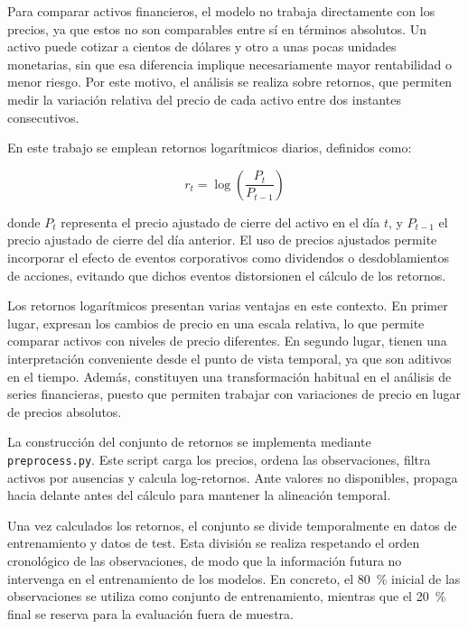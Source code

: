Para comparar activos financieros, el modelo no trabaja directamente con los precios, ya que estos no son comparables entre sí en términos absolutos. Un activo puede cotizar a cientos de dólares y otro a unas pocas unidades monetarias, sin que esa diferencia implique necesariamente mayor rentabilidad o menor riesgo. Por este motivo, el análisis se realiza sobre retornos, que permiten medir la variación relativa del precio de cada activo entre dos instantes consecutivos.

En este trabajo se emplean retornos logarítmicos diarios, definidos como:

\begin{equation}
r_t = \log\left(\frac{P_t}{P_{t-1}}\right)
\label{eq:retorno_logaritmico}
\end{equation}

donde \(P_t\) representa el precio ajustado de cierre del activo en el día \(t\), y \(P_{t-1}\) el precio ajustado de cierre del día anterior. El uso de precios ajustados permite incorporar el efecto de eventos corporativos como dividendos o desdoblamientos de acciones, evitando que dichos eventos distorsionen el cálculo de los retornos.

Los retornos logarítmicos presentan varias ventajas en este contexto. En primer lugar, expresan los cambios de precio en una escala relativa, lo que permite comparar activos con niveles de precio diferentes. En segundo lugar, tienen una interpretación conveniente desde el punto de vista temporal, ya que son aditivos en el tiempo. Además, constituyen una transformación habitual en el análisis de series financieras, puesto que permiten trabajar con variaciones de precio en lugar de precios absolutos.

La construcción del conjunto de retornos se implementa mediante \texttt{preprocess.py}. Este script carga los precios, ordena las observaciones, filtra activos por ausencias y calcula log-retornos. Ante valores no disponibles, propaga hacia delante antes del cálculo para mantener la alineación temporal.

Una vez calculados los retornos, el conjunto se divide temporalmente en datos de entrenamiento y datos de test. Esta división se realiza respetando el orden cronológico de las observaciones, de modo que la información futura no intervenga en el entrenamiento de los modelos. En concreto, el 80~\% inicial de las observaciones se utiliza como conjunto de entrenamiento, mientras que el 20~\% final se reserva para la evaluación fuera de muestra.

